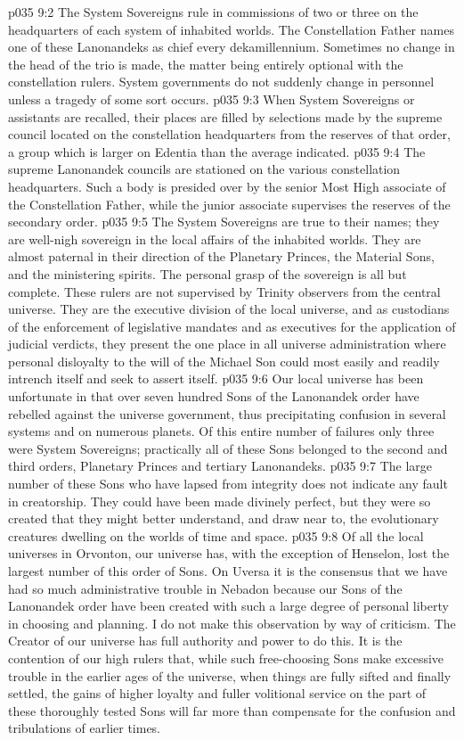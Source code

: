 \vs p035 9:2 The System Sovereigns rule in commissions of two or three on the headquarters of each system of inhabited worlds. The Constellation Father names one of these Lanonandeks as chief every dekamillennium. Sometimes no change in the head of the trio is made, the matter being entirely optional with the constellation rulers. System governments do not suddenly change in personnel unless a tragedy of some sort occurs.
\vs p035 9:3 When System Sovereigns or assistants are recalled, their places are filled by selections made by the supreme council located on the constellation headquarters from the reserves of that order, a group which is larger on Edentia than the average indicated.
\vs p035 9:4 The supreme Lanonandek councils are stationed on the various constellation headquarters. Such a body is presided over by the senior Most High associate of the Constellation Father, while the junior associate supervises the reserves of the secondary order.
\vs p035 9:5 \pc The System Sovereigns are true to their names; they are well\hyp{}nigh sovereign in the local affairs of the inhabited worlds. They are almost paternal in their direction of the Planetary Princes, the Material Sons, and the ministering spirits. The personal grasp of the sovereign is all but complete. These rulers are not supervised by Trinity observers from the central universe. They are the executive division of the local universe, and as custodians of the enforcement of legislative mandates and as executives for the application of judicial verdicts, they present the one place in all universe administration where personal disloyalty to the will of the Michael Son could most easily and readily intrench itself and seek to assert itself.
\vs p035 9:6 Our local universe has been unfortunate in that over seven hundred Sons of the Lanonandek order have rebelled against the universe government, thus precipitating confusion in several systems and on numerous planets. Of this entire number of failures only three were System Sovereigns; practically all of these Sons belonged to the second and third orders, Planetary Princes and tertiary Lanonandeks.
\vs p035 9:7 The large number of these Sons who have lapsed from integrity does not indicate any fault in creatorship. They could have been made divinely perfect, but they were so created that they might better understand, and draw near to, the evolutionary creatures dwelling on the worlds of time and space.
\vs p035 9:8 Of all the local universes in Orvonton, our universe has, with the exception of Henselon, lost the largest number of this order of Sons. On Uversa it is the consensus that we have had so much administrative trouble in Nebadon because our Sons of the Lanonandek order have been created with such a large degree of personal liberty in choosing and planning. I do not make this observation by way of criticism. The Creator of our universe has full authority and power to do this. It is the contention of our high rulers that, while such free\hyp{}choosing Sons make excessive trouble in the earlier ages of the universe, when things are fully sifted and finally settled, the gains of higher loyalty and fuller volitional service on the part of these thoroughly tested Sons will far more than compensate for the confusion and tribulations of earlier times.
